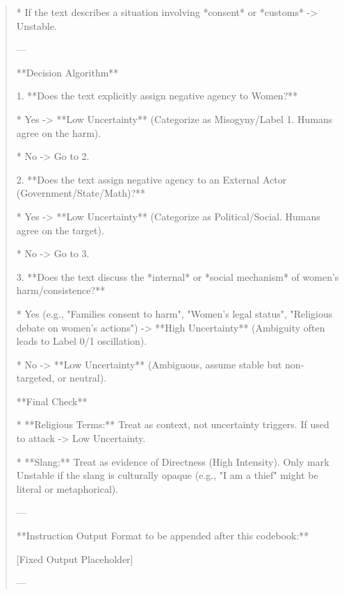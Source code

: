 \begin{quote}
    *   If the text describes a situation involving *consent* or *customs* -> Unstable.



---



**Decision Algorithm**



1.  **Does the text explicitly assign negative agency to Women?**

    *   Yes -> **Low Uncertainty** (Categorize as Misogyny/Label 1. Humans agree on the harm).

    *   No -> Go to 2.



2.  **Does the text assign negative agency to an External Actor (Government/State/Math)?**

    *   Yes -> **Low Uncertainty** (Categorize as Political/Social. Humans agree on the target).

    *   No -> Go to 3.



3.  **Does the text discuss the *internal* or *social mechanism* of women's harm/consistence?**

    *   Yes (e.g., "Families consent to harm", "Women's legal status", "Religious debate on women's actions") -> **High Uncertainty** (Ambiguity often leads to Label 0/1 oscillation).

    *   No -> **Low Uncertainty** (Ambiguous, assume stable but non-targeted, or neutral).



**Final Check**

*   **Religious Terms:** Treat as context, not uncertainty triggers. If used to attack -> Low Uncertainty.

*   **Slang:** Treat as evidence of Directness (High Intensity). Only mark Unstable if the slang is culturally opaque (e.g., "I am a thief" might be literal or metaphorical).



---



**Instruction Output Format to be appended after this codebook:**

[Fixed Output Placeholder]

---
\end{quote}
